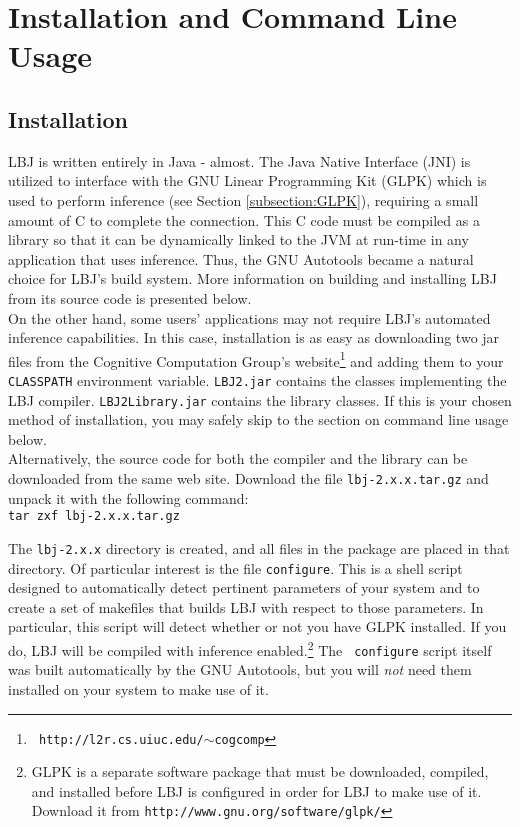 
\chapter{Installation and Command Line Usage}

\section{Installation} \label{section:installation}

LBJ is written entirely in Java - almost.  The Java Native Interface (JNI) is
utilized to interface with the GNU Linear Programming Kit (GLPK) which is used
to perform inference (see Section \ref{subsection:GLPK}), requiring a small
amount of C to complete the connection.  This C code must be compiled as a
library so that it can be dynamically linked to the JVM at run-time in any
application that uses inference.  Thus, the GNU Autotools became a natural
choice for LBJ's build system.  More information on building and installing
LBJ from its source code is presented below. \\

On the other hand, some users' applications may not require LBJ's automated
inference capabilities.  In this case, installation is as easy as downloading
two jar files from the Cognitive Computation Group's website\footnote{{\tt
http://l2r.cs.uiuc.edu/$\sim$cogcomp}} and adding them to your {\tt CLASSPATH}
environment variable.  {\tt LBJ2.jar} contains the classes implementing the
LBJ compiler.  {\tt LBJ2Library.jar} contains the library classes.  If this is
your chosen method of installation, you may safely skip to the section on
command line usage below. \\

Alternatively, the source code for both the compiler and the library can be
downloaded from the same web site.  Download the file {\tt lbj-2.x.x.tar.gz}
and unpack it with the following command: \\

\vspace{-.25cm}
{\tt tar zxf lbj-2.x.x.tar.gz} \\
\vspace{-.25cm}

\noindent
The {\tt lbj-2.x.x} directory is created, and all files in the package are
placed in that directory.  Of particular interest is the file {\tt configure}.
This is a shell script designed to automatically detect pertinent parameters
of your system and to create a set of makefiles that builds LBJ with respect
to those parameters.  In particular, this script will detect whether or not
you have GLPK installed.  If you do, LBJ will be compiled with inference
enabled.\footnote{GLPK is a separate software package that must be downloaded,
compiled, and installed before LBJ is configured in order for LBJ to make use
of it.  Download it from {\tt http://www.gnu.org/software/glpk/}}  The {\tt
configure} script itself was built automatically by the GNU Autotools, but you
will \emph{not} need them installed on your system to make use of it. \\

